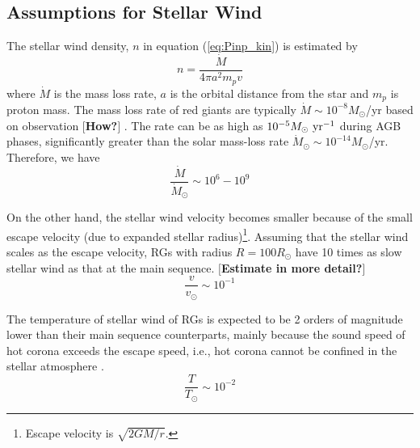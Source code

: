 \documentclass{emulateapj}
\def\memoYF#1{\color{red}$[${\bf #1}$]$ \color{black}}
\def\memoDS#1{\color{blue}$[${\bf #1}$]$ \color{black}}
\begin{document}






\subsection{Assumptions for Stellar Wind}
\label{ss:stellarwind}

The stellar wind density, $n$ in equation (\ref{eq:Pinp_kin}) is estimated by
\begin{equation}
n = \frac{\dot M}{4\pi a^2 m_p v}
\end{equation}
where $\dot M$ is the mass loss rate, $a$ is the orbital distance from the star and $m_p$ is proton mass. 
The mass loss rate of red giants are typically $\dot M \sim 10^{-8} M_{\odot}$/yr based on observation \memoYF{How?}. The rate can be as high as $10^{-5} M_\odot~{\rm yr^{-1}}$ during AGB phases, significantly greater than the solar mass-loss rate $\dot M_{\odot } \sim 10^{-14} M_{\odot}$/yr. 
Therefore, we have
\begin{equation}
\frac{\dot M}{\dot M_{\odot}} \sim 10^6 - 10^9
\end{equation}

On the other hand, the stellar wind velocity becomes smaller because of the small escape velocity (due to expanded stellar radius)\footnote{Escape velocity is $\sqrt{2GM/r}$.}. Assuming that the stellar wind scales as the escape velocity, RGs with radius $R=100R_{\odot}$ have 10 times as slow stellar wind as that at the main sequence. \memoYF{Estimate in more detail?}
\begin{equation}
\frac{v}{v_{\odot}} \sim 10^{-1}
\end{equation}

The temperature of stellar wind of RGs is expected to be 2 orders of magnitude lower than their main sequence counterparts, mainly because the sound speed of hot corona exceeds the escape speed, i.e., hot corona cannot be confined in the stellar atmosphere \citep{suzuki2008}. 
\begin{equation}
\frac{T}{T_{\odot}} \sim 10^{-2}
\end{equation}
\end{document}
